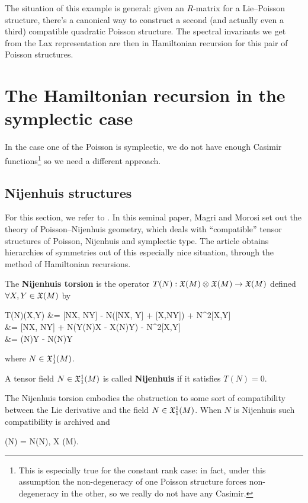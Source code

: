 \documentclass[main.tex]{subfiles}
\begin{document}
The situation of this example is general: given an $R$-matrix for a Lie--Poisson structure, there's a canonical way to construct a second (and actually even a third) compatible quadratic Poisson structure. The spectral invariants we get from the Lax representation are then in Hamiltonian recursion for this pair of Poisson structures.

\section{The Hamiltonian recursion in the symplectic case}
In the case one of the Poisson is symplectic, we do not have enough Casimir functions\footnote{This is especially true for the constant rank case: in fact, under this assumption the non-degeneracy of one Poisson structure forces non-degeneracy in the other, so we really do not have any Casimir.} so we need a different approach.

\subsection{Nijenhuis structures}
For this section, we refer to \cite{magri1984geometrical}. In this seminal paper, Magri and Morosi set out the theory of Poisson--Nijenhuis geometry, which deals with ``compatible'' tensor structures of Poisson, Nijenhuis and symplectic type. The article obtains hierarchies of symmetries out of this especially nice situation, through the method of Hamiltonian recursions.

\begin{definition}
	The \textbf{Nijenhuis torsion} is the operator $T(N) : \mathfrak{X}(M) \otimes_{} \mathfrak{X}(M) \to \mathfrak{X}(M)$ defined $\forall X,Y \in \mathfrak{X}(M)$ by
	\begin{eqalign}
		T(N)(X,Y) &= [NX, NY] - N([NX, Y] + [X,NY]) + N^2[X,Y]\\
		&= [NX, NY] + N(\Lie Y(N)X - \Lie X(N)Y) - N^2[X,Y]\\
		&= (N)Y - N(N)Y
	\end{eqalign}
	where $N \in \mathfrak{X}^1_1(M)$.
\end{definition}

\begin{definition}
	A tensor field $N \in \mathfrak{X}^1_1(M)$ is called \textbf{Nijenhuis} if it satisfies $T(N) = 0$.
\end{definition}

The Nijenhuis torsion embodies the obstruction to some sort of compatibility between the Lie derivative and the field $N\in\mathfrak{X}^1_1(M)$. When $N$ is Nijenhuis such compatibility is archived and
\begin{eqalign}
\label{eq:nijenhuis_prop}
	(N) = N(N), \quad\forall X \in \fields(M).
\end{eqalign}
\end{document}

